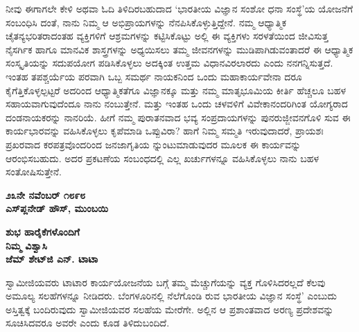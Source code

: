 ನೀವು ಈಗಾಗಲೇ ಕೇಳಿ ಅಥವಾ ಓದಿ ತಿಳಿದಿರಬಹುದಾದ ‘ಭಾರತೀಯ ವಿಜ್ಞಾನ ಸಂಶೋ ಧನಾ ಸಂಸ್ಥೆ’ಯ  ಯೋಜನೆಗೆ ಸಂಬಂಧಿಸಿ ದಂತೆ, ನಾನು ನಿಮ್ಮ ಆ ಅಭಿಪ್ರಾಯಗಳನ್ನು ನೆನಪಿಸಿಕೊಳ್ಳುತ್ತಿದ್ದೇನೆ. ನಮ್ಮ ಆಧ್ಯಾತ್ಮಿಕ ಚೈತನ್ಯಭರಿತರಾದಂತಹ ವ್ಯಕ್ತಿಗಳಿಗೆ ಆಶ್ರಮಗಳನ್ನು ಕಟ್ಟಿಸಿಕೊಟ್ಟು ಅಲ್ಲಿ ಈ ವ್ಯಕ್ತಿಗಳು ಸರಳತೆಯಿಂದ ಜೀವಿಸುತ್ತ ನೈಸರ್ಗಿಕ ಹಾಗೂ ಮಾನವಿಕ ಶಾಸ್ತ್ರಗಳನ್ನು ಅಧ್ಯಯಿಸಲು ತಮ್ಮ ಜೀವನಗಳನ್ನು ಮುಡಿಪಾಗಿಡುವಂತಾದರೆ ಈ ಆಧ್ಯಾತ್ಮಿಕ ಸಂಸ್ಕೃತಿಯನ್ನು ಸದುಪಯೋಗ ಪಡಿಸಿಕೊಳ್ಳಲು ಅದಕ್ಕಿಂತ ಉತ್ತಮ ವಿಧಾನವಿರಲಾರದು ಎಂದು ನನಗನ್ನಿಸುತ್ತದೆ. ಇಂತಹ ತಪಶ್ಚರ್ಯೆಯ ಪರವಾಗಿ ಒಬ್ಬ ಸಮರ್ಥ ನಾಯಕನಿಂದ ಒಂದು ಮಹಾಕಾರ್ಯವೇನಾ ದರೂ ಕೈಗೆತ್ತಿಕೊಳ್ಳಲ್ಪಟ್ಟರೆ ಅದರಿಂದ ಆಧ್ಯಾತ್ಮಿಕತೆಗೂ ವಿಜ್ಞಾನಕ್ಕೂ ಮತ್ತು ನಮ್ಮ ಮಾತೃಭೂಮಿಯ ಕೀರ್ತಿ ಹೆಚ್ಚಲೂ ಬಹಳ ಸಹಾಯವಾಗುವುದೆಂದೂ ನಾನು ನಂಬುತ್ತೇನೆ. ಮತ್ತು ಇಂತಹ ಒಂದು ಚಳವಳಿಗೆ ವಿವೇಕಾನಂದರಿಗಿಂತ ಯೋಗ್ಯರಾದ ದಂಡನಾಯಕರನ್ನು ನಾನರಿಯೆ. ಹೀಗೆ ನಮ್ಮ ಪುರಾತನವಾದ ಭವ್ಯ ಸಂಪ್ರದಾಯಗಳನ್ನು ಪುನರುಜ್ಜೀವನಗೊಳಿ ಸುವ ಈ ಕಾರ್ಯಭಾರವನ್ನು ವಹಿಸಿಕೊಳ್ಳಲು ಕೃಪೆಮಾಡಿ ಒಪ್ಪುವಿರಾ? ಹಾಗೆ ನಿಮ್ಮ ಸಮ್ಮತಿ ಇರುವುದಾದರೆ, ಪ್ರಾಯಶಃ ಪ್ರಖರವಾದ ಕರಪತ್ರವೊಂದರಿಂದ ಜನಜಾಗೃತಿಯ ನ್ನುಂಟುಮಾಡುವುದರ ಮೂಲಕ ಈ ಕಾರ್ಯವನ್ನು ಆರಂಭಿಸಬಹುದು. ಅದರ ಪ್ರಕಟಣೆಯ ಸಂಬಂಧದಲ್ಲಿ ಎಲ್ಲ ಖರ್ಚುಗಳನ್ನೂ ವಹಿಸಿಕೊಳ್ಳಲು ನಾನು ಬಹಳ ಸಂತೋಷಿಸುತ್ತೇನೆ.

\textbf{೨೩ನೇ ನವೆಂಬರ್ ೧೮೯೮\\ಎಸ್​ಪ್ಲನೇಡ್ ಹೌಸ್, ಮುಂಬಯಿ}

\begin{flushright}
\textbf{ಶುಭ ಹಾರೈಕೆಗಳೊಂದಿಗೆ\\ನಿಮ್ಮ ವಿಶ್ವಾಸಿ\\ಜೆಮ್ ಶೇಟ್​ಜಿ ಎನ್. ಟಾಟಾ}
\end{flushright}

ಸ್ವಾಮೀಜಿಯವರು ಟಾಟಾರ ಕಾರ್ಯಯೋಜನೆಯ ಬಗ್ಗೆ ತಮ್ಮ ಮೆಚ್ಚುಗೆಯನ್ನು ವ್ಯಕ್ತ ಗೊಳಿಸಿದರಲ್ಲದೆ ಕೆಲವು ಅಮೂಲ್ಯ ಸಲಹೆಗಳನ್ನೂ ನೀಡಿದರು. ಬೆಂಗಳೂರಿನಲ್ಲಿ ನೆಲೆಗೊಂಡಿ ರುವ ಭಾರತೀಯ ವಿಜ್ಞಾನ ಸಂಸ್ಥೆ’ ಎಂಬುದು ಅಸ್ತಿತ್ವಕ್ಕೆ ಬಂದಿರುವುದು ಸ್ವಾಮೀಜಿಯವರ ಸಲಹೆಯ ಮೇರೆಗೇ. ಅಲ್ಲಿನ ಆ ಪ್ರಶಾಂತವಾದ ಅರಣ್ಯ ಪ್ರದೇಶವನ್ನು ಸೂಚಿಸಿದವರೂ ಅವರೇ ಎಂದು ಕೂಡ ತಿಳಿದುಬಂದಿದೆ.

